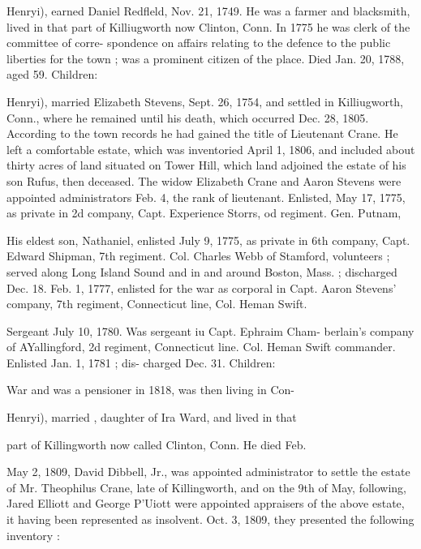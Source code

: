 \documentclass{book}
\begin{document}
Henryi), earned Daniel Redfleld, Nov. 21, 1749. He was a 
farmer and blacksmith, lived in that part of Killiugworth now 
Clinton, Conn. In 1775 he was clerk of the committee of corre- 
spondence on affairs relating to the defence to the public liberties 
for the town ; was a prominent citizen of the place. Died Jan. 
20, 1788, aged 59. Children: 











Henryi), married Elizabeth Stevens, Sept. 26, 1754, and settled 
in Killiugworth, Conn., where he remained until his death, which 
occurred Dec. 28, 1805. According to the town records he had 
gained the title of Lieutenant Crane. He left a comfortable 
estate, which was inventoried April 1, 1806, and included about 
thirty acres of land situated on Tower Hill, which land adjoined 
the estate of his son Rufus, then deceased. The widow Elizabeth 
Crane and Aaron Stevens were appointed administrators Feb. 4, 
the rank of lieutenant. Enlisted, May 17, 1775, as private in 2d 
company, Capt. Experience Storrs, od regiment. Gen. Putnam, 

His eldest son, Nathaniel, enlisted July 9, 1775, as private in 
6th company, Capt. Edward Shipman, 7th regiment. Col. Charles 
Webb of Stamford, volunteers ; served along Long Island Sound 
and in and around Boston, Mass. ; discharged Dec. 18. Feb. 1, 
1777, enlisted for the war as corporal in Capt. Aaron Stevens' 
company, 7th regiment, Connecticut line, Col. Heman Swift. 




Sergeant July 10, 1780. Was sergeant iu Capt. Ephraim Cham- 
berlain's company of AYallingford, 2d regiment, Connecticut line. 
Col. Heman Swift commander. Enlisted Jan. 1, 1781 ; dis- 
charged Dec. 31. Children: 

War and was a pensioner in 1818, was then living in Con- 








Henryi), married , daughter of Ira Ward, and lived in that 

part of Killingworth now called Clinton, Conn. He died Feb. 

May 2, 1809, David Dibbell, Jr., was appointed administrator 
to settle the estate of Mr. Theophilus Crane, late of Killingworth, 
and on the 9th of May, following, Jared Elliott and George 
P'Uiott were appointed appraisers of the above estate, it having 
been represented as insolvent. Oct. 3, 1809, they presented the 
following inventory : 
\end{document}
